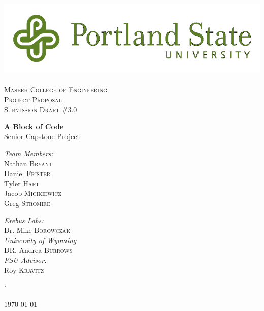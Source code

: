 
\usepackage{pstricks}
\linespread{1.1}

\begin{titlepage}
\begin{center}

\includegraphics[width=.75\textwidth]{./PSU_logo.png}~\\[.5cm]

\textsc{\LARGE \color{PSU} Maseeh College of Engineering}\\[1.5cm]

\textsc{\Large Project Proposal}\\[0.5cm]
\textsc{\Large Submission Draft \#3.0}\\[0.5cm]
\vspace{1cm}

{ \huge \bfseries\color{PSU} A Block of Code\\[0.4cm] }
  \large Senior Capstone Project

\vspace{2.5cm}
 \begin{multicols}{2}

\begin{flushleft}
\noindent
 \large
\emph{\color{PSU}Team Members:}\\
Nathan \textsc{Bryant}\\
Daniel \textsc{Frister}\\
Tyler  \textsc{Hart}\\
Jacob   \textsc{Micikiewicz}\\
Greg    \textsc{Stromire}\\
\end{flushleft}

 \begin{flushleft}
  \large
 \emph{\color{PSU}Erebus Labs:} \\
 Dr. Mike  \textsc{Borowczak}\\
 \emph{\color{PSU}University of Wyoming}\\
 DR. Andrea \textsc{Burrows}\\
 \emph{\color{PSU}PSU Advisor:}\\
 Roy \textsc{Kravitz}
 \end{flushleft}


 \end{multicols}`
\vfill

{\large \today}

\end{center}
\end{titlepage}
 \tableofcontents

